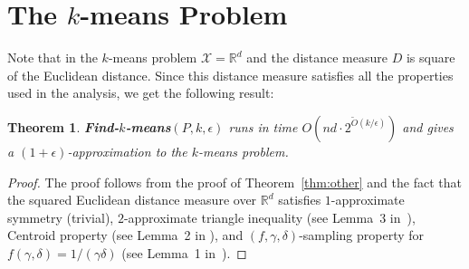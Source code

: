 \documentclass[11pt]{article}
\newtheorem{theorem}{Theorem}
\newcommand{\eps}{{\epsilon}}
\begin{document}
\section{The $k$-means Problem}\label{sec:k-means}

Note that in the $k$-means problem $\mathcal{X} = \mathbb{R}^d$ and the distance measure $D$ is square of the Euclidean distance. 
Since this distance measure satisfies all the properties used in the analysis, we get the following result:

\begin{theorem}
{\bf Find-$k$-means}$(P, k, \eps)$ runs in time $O \left(nd \cdot 2^{\tilde{O}(k/\eps)} \right)$ and gives a $(1 + \eps)$-approximation to the $k$-means problem.
\end{theorem}
\begin{proof}
The proof follows from the proof of Theorem~\ref{thm:other} and the fact that the squared Euclidean distance measure over $\mathbb{R}^d$ satisfies $1$-approximate symmetry (trivial), $2$-approximate triangle inequality (see Lemma~3 in~\cite{jks12}), Centroid property (see Lemma~2 in \cite{jks12}), and $(f, \gamma, \delta)$-sampling property for $f(\gamma, \delta) = 1/(\gamma \delta)$ (see Lemma~1 in~\cite{jks12}).
\qedhere
\end{proof}


\end{document}
